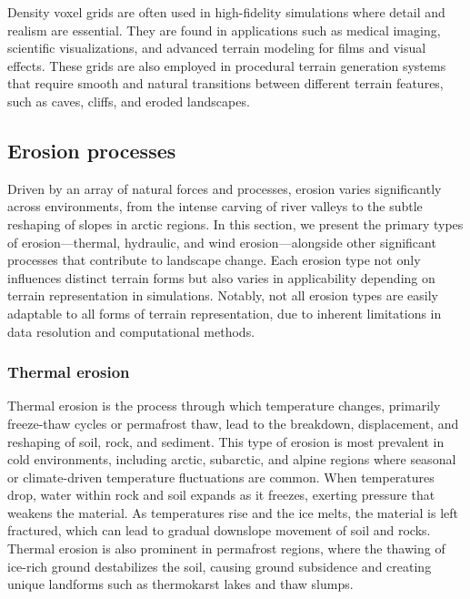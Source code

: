 
Density voxel grids are often used in high-fidelity simulations where detail and realism are essential. They are found in applications such as medical imaging, scientific visualizations, and advanced terrain modeling for films and visual effects. These grids are also employed in procedural terrain generation systems that require smooth and natural transitions between different terrain features, such as caves, cliffs, and eroded landscapes.




\subsection{Erosion processes}
Driven by an array of natural forces and processes, erosion varies significantly across environments, from the intense carving of river valleys to the subtle reshaping of slopes in arctic regions. In this section, we present the primary types of erosion—thermal, hydraulic, and wind erosion—alongside other significant processes that contribute to landscape change. Each erosion type not only influences distinct terrain forms but also varies in applicability depending on terrain representation in simulations. Notably, not all erosion types are easily adaptable to all forms of terrain representation, due to inherent limitations in data resolution and computational methods.

\subsubsection{Thermal erosion}
Thermal erosion is the process through which temperature changes, primarily freeze-thaw cycles or permafrost thaw, lead to the breakdown, displacement, and reshaping of soil, rock, and sediment. This type of erosion is most prevalent in cold environments, including arctic, subarctic, and alpine regions where seasonal or climate-driven temperature fluctuations are common. When temperatures drop, water within rock and soil expands as it freezes, exerting pressure that weakens the material. As temperatures rise and the ice melts, the material is left fractured, which can lead to gradual downslope movement of soil and rocks. Thermal erosion is also prominent in permafrost regions, where the thawing of ice-rich ground destabilizes the soil, causing ground subsidence and creating unique landforms such as thermokarst lakes and thaw slumps.

